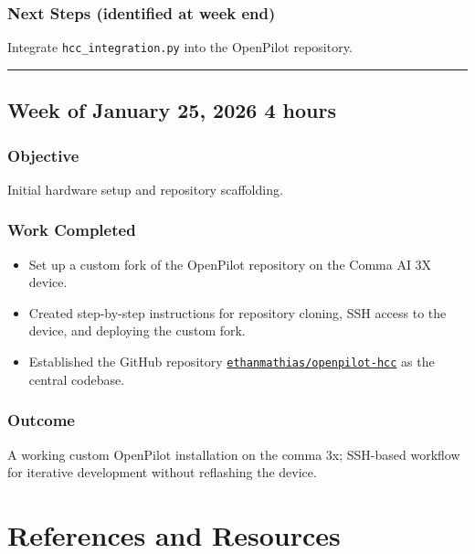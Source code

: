 \documentclass[12pt]{article}
\begin{document}
\subsubsection{Next Steps (identified at week end)}
Integrate \texttt{hcc\_integration.py} into the OpenPilot repository.

\hrule\vspace{0.5em}

\subsection{Week of January 25, 2026 \hfill \normalfont\small 4 hours}

\subsubsection{Objective}
Initial hardware setup and repository scaffolding.

\subsubsection{Work Completed}
\begin{itemize}
  \item Set up a custom fork of the OpenPilot repository on the Comma AI 3X device.
  \item Created step-by-step instructions for repository cloning, SSH access to the device, and deploying the custom fork.
  \item Established the GitHub repository \href{https://github.com/ethanmathias/openpilot-hcc}{\texttt{ethanmathias/openpilot-hcc}} as the central codebase.
\end{itemize}

\subsubsection{Outcome}
A working custom OpenPilot installation on the comma 3x; SSH-based workflow for iterative development without reflashing the device.

\section{References and Resources}
\end{document}
